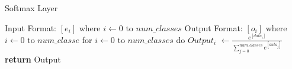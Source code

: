 \documentclass[10pt]{article}
\begin{document}
    \begin{algorithm}[H]
      \caption{Softmax Layer}
          \begin{algorithmic}[7]
              \State Input Format: $[e_{i}]$ where $i \gets 0$ to $num\_classes$
              \State
              \State Output Format: $[o_{i}]$ where $i \gets 0$ to $num\_classe$
              \State
              \State for $i \gets 0$ to $num\_classes$ do
              \State \hspace{1cm} $Output_i$ $\gets \frac{e^{[data_{i}]}}{\sum_{j=0}^{num\_classes} e^{[data_{j}]}}$ 
              \State \textbf{return} Output 
          \EndProcedure
          \end{algorithmic}
          
      \end{algorithm}
\end{document}
